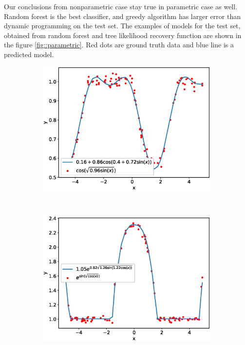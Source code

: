 \documentclass[12pt]{article}
\begin{document}
Our conclusions from nonparametric case stay true in parametric case as well.
Random forest is the best classifier, and greedy algorithm has larger error than dynamic programming on the test set.
The examples of models for the test set, obtained from random forest and tree likelihood recovery function are shown in the figure \ref{fig::parametric}.
Red dots are ground truth data and blue line is a predicted model.
\newpage
\begin{figure}[!ht]
\centering
\begin{subfigure}{0.48\textwidth}
\includegraphics[width=\textwidth]{_res_param_1.eps}
\caption{}
\label{fig::_res_param_1}
\end{subfigure}
~
\begin{subfigure}{0.48\textwidth}
\includegraphics[width=\textwidth]{_res_param_2.eps}

\end{subfigure}
\end{figure}
\end{document}
